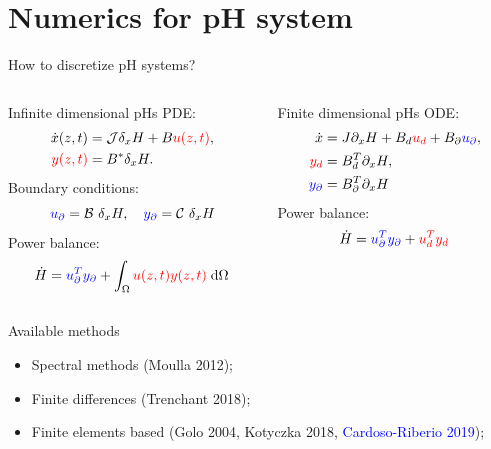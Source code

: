 \documentclass[aspectratio=169]{ISAE-Beamer}
\begin{document}
\section{Numerics for pH system}

\begin{frame}{How to discretize pH systems?}
\begin{columns}[T]
	\setlength{\abovedisplayskip}{1pt}
	\setlength{\belowdisplayskip}{1pt}
	\begin{column}{.4\textwidth}
	\begin{block}{Infinite dimensional pHs}
		PDE:
		\begin{align*}
		\dot{x}(z, t) &= \mathcal{J} \delta_x {H} + B \textcolor{red}{u(z, t)}, \\
		\textcolor{red}{y(z, t)} &= B^* \delta_x {H}.
		\end{align*}
		Boundary conditions: 
		\[\textcolor{blue}{u_\partial} = \mathcal{B}\ \delta_x {H}, \quad \textcolor{blue}{y_\partial} = \mathcal{C}\ \delta_x {H} \]
		Power balance: 
		\[ \dot{H} = \displaystyle \textcolor{blue}{u_\partial^T y_\partial} +  \int_{\Omega} \textcolor{red}{u(z, t) y(z, t)} \d{\Omega}
		\]
	\end{block}
\end{column}
\begin{column}{.4\textwidth}
	\begin{block}{Finite dimensional pHs}
		ODE:
		\begin{align*}
		\dot{x} &= J \partial_x {H} + B_d \textcolor{red}{u_d} + B_\partial \textcolor{blue}{u_\partial}, \\
		\textcolor{red}{y_d} &= B_d^T \partial_x {H}, \\
		\textcolor{blue}{y_\partial} &= B_\partial^T \partial_x {H}
		\end{align*}
		Power balance: 
		\[ \dot{H} = \textcolor{blue}{u_\partial^T y_\partial} +  \textcolor{red}{u_d^T y_d}
		\]
	\end{block}
\end{column}
\end{columns}
\begin{exampleblock}{Available methods}
\begin{itemize}
	\item Spectral methods (Moulla 2012);
	\item Finite differences (Trenchant 2018);
	\item Finite elements based (Golo 2004, Kotyczka 2018, \textcolor{blue}{Cardoso-Riberio 2019});
\end{itemize}
\end{exampleblock}
\end{frame}
\end{document}
